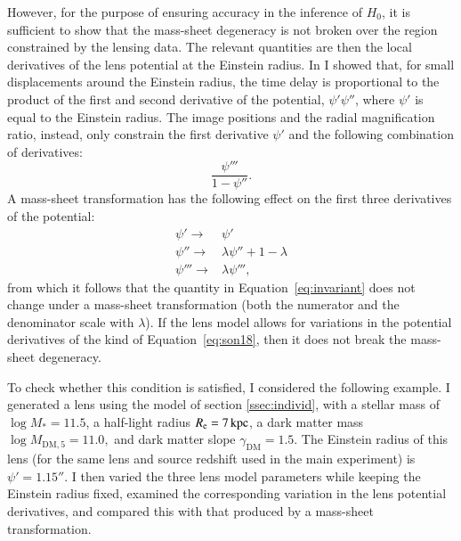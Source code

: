 \documentclass{aa}
\def\mstar{M_*}
\def\mfive{M_{\mathrm{DM},5}}
\def\gammadm{\gamma_{\mathrm{DM}}}
\def\reff{R_{\mathrm{e}}}
\def\Eref#1{Equation~\ref{#1}\xspace}
\begin{document}
However, for the purpose of ensuring accuracy in the inference of $H_0$, it is sufficient to show that the mass-sheet degeneracy is not broken over the region constrained by the lensing data.
The relevant quantities are then the local derivatives of the lens potential at the Einstein radius.
In \citet{Son18} I showed that, for small displacements around the Einstein radius, the time delay is proportional to the product of the first and second derivative of the potential, $\psi'\psi''$, where $\psi'$ is equal to the Einstein radius. The image positions and the radial magnification ratio, instead, only constrain the first derivative $\psi'$ and the following combination of derivatives:
\begin{equation}\label{eq:invariant}
\frac{\psi'''}{1 - \psi''}.
\end{equation}
A mass-sheet transformation has the following effect on the first three derivatives of the potential:
\begin{align}\label{eq:son18}
\psi' \rightarrow & \psi' \nonumber \\
\psi'' \rightarrow & \lambda\psi'' + 1 - \lambda \\
\psi''' \rightarrow & \lambda\psi''' \nonumber,
\end{align}
from which it follows that the quantity in \Eref{eq:invariant} does not change under a mass-sheet transformation (both the numerator and the denominator scale with $\lambda$).
If the lens model allows for variations in the potential derivatives of the kind of \Eref{eq:son18}, then it does not break the mass-sheet degeneracy.

To check whether this condition is satisfied, I considered the following example.
I generated a lens using the model of section \ref{ssec:individ}, with a stellar mass of $\log{\mstar}=11.5$, a half-light radius $\reff=7\,{\rm kpc}$, a dark matter mass $\log{\mfive}=11.0,$ and dark matter slope $\gammadm=1.5$. The Einstein radius of this lens (for the same lens and source redshift used in the main experiment) is $\psi'=1.15''$.
I then varied the three lens model parameters while keeping the Einstein radius fixed, examined the corresponding variation in the lens potential derivatives, and compared this with that produced by a mass-sheet transformation.
\end{document}
